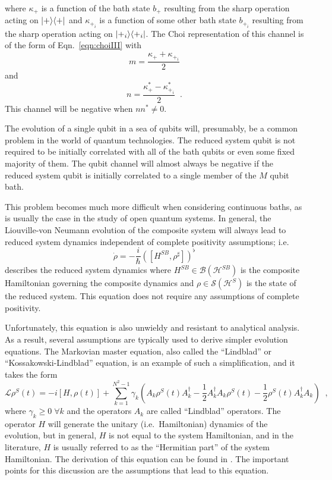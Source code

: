 where $\kappa_+$ is a function of the bath state $b_+$ resulting from the sharp operation acting on $|+\rangle\langle+|$ and $\kappa_{+_i}$ is a function of some other bath state $b_{+_i}$ resulting from the sharp operation acting on $|+_i\rangle\langle+_i|$.  The Choi representation of this channel is of the form of Eqn.\ \ref{eqn:choiIII} with
$$
m = \frac{\kappa_++\kappa_{+_i}}{2}
$$
and
$$
n = \frac{\kappa_+^*-\kappa_{+_i}^*}{2}\;\;.
$$
This channel will be negative when $nn^*\neq 0$.  

The evolution of a single qubit in a sea of qubits will, presumably, be a common problem in the world of quantum technologies.  The reduced system qubit is not required to be initially correlated with all of the bath qubits or even some fixed majority of them.  The qubit channel will almost always be negative if the reduced system qubit is initially correlated to a single member of the $M$ qubit bath.  

This problem becomes much more difficult when considering continuous baths, as is usually the case in the study of open quantum systems.  In general, the Liouville-von Neumann evolution of the composite system will always lead to reduced system dynamics independent of complete positivity assumptions; i.e.\
$$
\dot{\rho} = -\frac{i}{\hbar} \left([H^{SB},\rho^\sharp]\right)^\flat
$$
describes the reduced system dynamics where $H^{SB}\in\mathcal{B}(\mathcal{H}^{SB})$ is the composite Hamiltonian governing the composite dynamics and $\rho\in\mathcal{S}(\mathcal{H}^S)$ is the state of the reduced system.  This equation does not require any assumptions of complete positivity.  

Unfortunately, this equation is also unwieldy and resistant to analytical analysis.  As a result, several assumptions are typically used to derive simpler evolution equations.  The Markovian master equation, also called the ``Lindblad'' or ``Kossakowski-Lindblad'' equation, is an example of such a simplification, and it takes the form  
\begin{equation}
\label{eqn:lind}
\mathcal{L}\rho^S(t) = -i[H,\rho(t)] + \sum_{k=1}^{N^2-1} \gamma_k \left( A_k\rho^S(t) A_k^\dagger - \frac{1}{2}A_k^\dagger A_k\rho^S(t) - \frac{1}{2} \rho^S(t)A_k^\dagger A_k\right)\;\;,
\end{equation}
where $\gamma_k\ge 0\;\forall k$ and the operators $A_k$ are called ``Lindblad'' operators.  The operator $H$ will generate the unitary (i.e.\ Hamiltonian) dynamics of the evolution, but in general, $H$ is not equal to the system Hamiltonian, and in the literature, $H$ is usually referred to as the ``Hermitian part'' of the system Hamiltonian.  The derivation of this equation can be found in \cite{Breuer2007}.  The important points for this discussion are the assumptions that lead to this equation.


